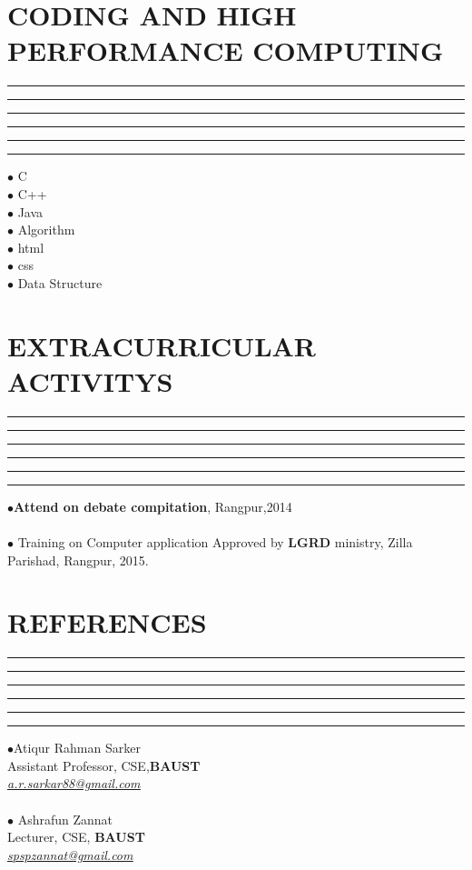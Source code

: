 \documentclass{article}
\begin{document}
\section*{\color{green}CODING AND HIGH PERFORMANCE COMPUTING }
\hrule \hrule \hrule \hrule \hrule \hrule
\vspace{0.4cm}
$\bullet$ \hspace{0.2cm}C \\
$\bullet$ \hspace{0.2cm}C++\\
 $\bullet$ \hspace{0.2cm}Java \\
 $\bullet$ \hspace{0.2cm}Algorithm\\
 $\bullet$ \hspace{0.2cm}html\\
 $\bullet$ \hspace{0.2cm}css\\
 $\bullet$ \hspace{0.2cm}Data Structure\\

 \section*{\color{green}EXTRACURRICULAR ACTIVITYS }
 \hrule \hrule \hrule \hrule \hrule \hrule
\vspace{0.4cm}
 $\bullet$\hspace{0.2cm}\textbf{Attend on debate compitation}, Rangpur,2014\\
 \\
 $\bullet$ \hspace{0.2cm}Training on Computer application Approved by \textbf{LGRD} ministry, Zilla Parishad, \hspace*{0.4cm}Rangpur, 2015. \\
 
 \section*{\color{green}REFERENCES }
  \hrule \hrule \hrule \hrule \hrule \hrule
\vspace{0.4cm}
 $\bullet$\hspace{0.2cm}Atiqur Rahman Sarker\\ \hspace*{0.4cm}Assistant Professor, CSE,\textbf{BAUST}\\
 \textit{\hspace*{0.4cm}\href{mailto:a.r.sarkar88@gmail.com}{\underline{\color{blue}a.r.sarkar88@gmail.com}}}\\
 \\
  $\bullet$ \hspace{0.2cm}Ashrafun Zannat\\ \hspace*{0.4cm}Lecturer, CSE, \textbf{BAUST}\\
 \textit{\hspace*{0.4cm}\href{mailto:spspzannat@gmail.com}{\underline{\color{blue}spspzannat@gmail.com}}}
\end{document}
